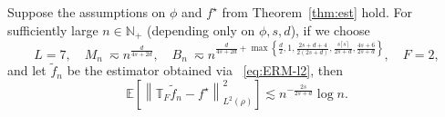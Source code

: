 \documentclass[11pt]{article}
\begin{document}
\begin{theorem}
    \label{thm:est-l2}
    Suppose the assumptions on $\phi$ and $f^{\star}$ from Theorem~\ref{thm:est} hold. For sufficiently large $n \in \mathbb{N}_{+}$ (depending only on $\phi, s, d$), if we choose 
    \begin{equation*}
        L = 7, \quad M_n ~\eqsim n^{\frac{d}{4s+2d}}, \quad B_n ~\eqsim n^{\frac{d}{4s+2d}+\max \left\{ \frac{d}{2}, 1, \frac{2s+d+4}{2(2s+d)}, \frac{s \lceil s\rceil}{2s+d},\frac{4s+6}{2s+d} \right\}} , \quad F=2,
    \end{equation*}
    and let $\widetilde{f}_n$ be the estimator obtained via ~\eqref{eq:ERM-l2}, then 
    \begin{equation}
        \mathbb{E} \left[ \left\| \mathbb{T}_{F} \widetilde{f}_n - f^{\star}\right\|_{L^2(\rho)}^2  
        \right] \lesssim  n^{-\frac{2s}{2s + d}} \log n.
        \label{eq: gen_rate_upper-l2}
    \end{equation}
\end{theorem}
\end{document}
